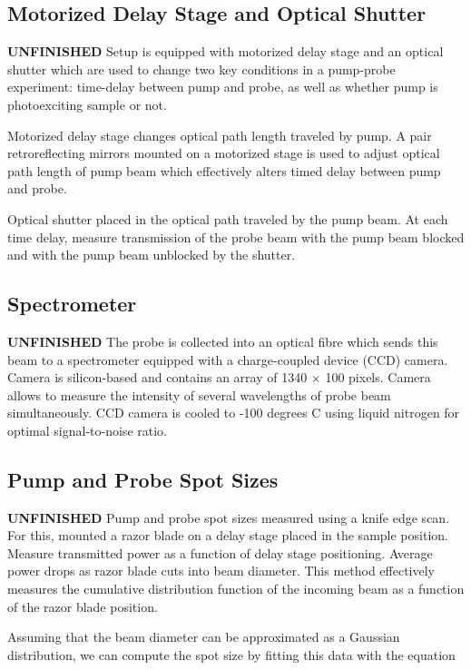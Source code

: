 \subsection{Motorized Delay Stage and Optical Shutter}

\textbf{\color{red}UNFINISHED} Setup is equipped with motorized delay stage and an optical shutter which are used to change two key conditions in a pump-probe experiment: time-delay between pump and probe, as well as whether pump is photoexciting sample or not. 

Motorized delay stage changes optical path length traveled by pump. A pair retroreflecting mirrors mounted on a motorized stage is used to adjust optical path length of pump beam which effectively alters timed delay between pump and probe. 

Optical shutter placed in the optical path traveled by the pump beam. At each time delay, measure transmission of the probe beam with the pump beam blocked and with the pump beam unblocked by the shutter.  



\subsection{Spectrometer}
\textbf{\color{red}UNFINISHED}
The probe is collected into an optical fibre which sends this beam to a spectrometer equipped with a charge-coupled device (CCD) camera. Camera is silicon-based and contains an array of 1340 $\times$ 100 pixels. Camera allows to measure the intensity of several wavelengths of probe beam simultaneously. CCD camera is cooled to -100 degrees C using liquid nitrogen for optimal signal-to-noise ratio. 

\subsection{Pump and Probe Spot Sizes}
\textbf{\color{red}UNFINISHED}
Pump and probe spot sizes measured using a knife edge scan. For this, mounted a razor blade on a delay stage placed in the sample position. Measure transmitted power as a function of delay stage positioning. Average power drops as razor blade cuts into beam diameter. This method effectively measures the cumulative distribution function of the incoming beam as a function of the razor blade position.

Assuming that the beam diameter can be approximated as a Gaussian distribution, we can compute the spot size by fitting this data with the equation 

